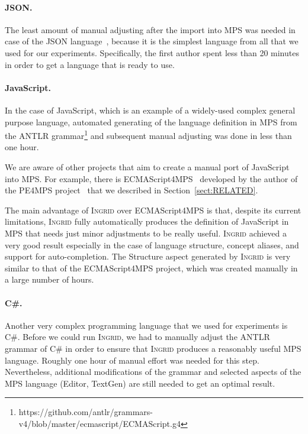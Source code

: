 \paragraph{JSON.}
The least amount of manual adjusting after the import into MPS was needed in case of the JSON language~\cite{ref:JSON}, because it is the simplest language from all that we used for our experiments.
Specifically, the first author spent less than 20 minutes in order to get a language that is ready to use.

\paragraph{JavaScript.}
In the case of JavaScript, which is an example of a widely-used complex general purpose language, automated generating of the language definition in MPS from the ANTLR grammar\footnote{https://github.com/antlr/grammars-v4/blob/master/ecmascript/ECMAScript.g4} and subsequent manual adjusting was done in less than one hour.

We are aware of other projects that aim to create a manual port of JavaScript into MPS.
For example, there is ECMAScript4MPS~\cite{ref:ECMA4MPS} developed by the author of the PE4MPS project~\cite{ref:PE4MPS} that we described in Section~\ref{sect:RELATED}.

The main advantage of \textsc{Ingrid} over ECMAScript4MPS is that, despite its current limitations, \textsc{Ingrid} fully automatically produces the definition of JavaScript in MPS that needs just minor adjustments to be really useful.
\textsc{Ingrid} achieved a very good result especially in the case of language structure, concept aliases, and support for auto-completion.
The Structure aspect generated by \textsc{Ingrid} is very similar to that of the ECMAScript4MPS project, which was created manually  in a large number of hours.

\paragraph{C\#.}
Another very complex programming language that we used for experiments is C\#.
Before we could run \textsc{Ingrid}, we had to manually adjust the ANTLR grammar of C\# in order to ensure that \textsc{Ingrid} produces a reasonably useful MPS language.
Roughly one hour of manual effort was needed for this step.
Nevertheless, additional modifications of the grammar and selected aspects of the MPS language (Editor, TextGen) are still needed to get an optimal result.

